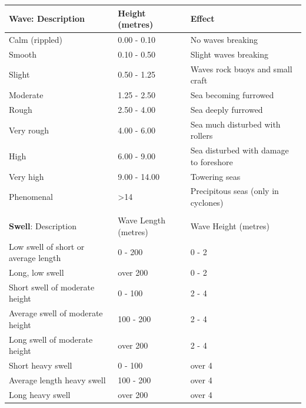 \documentclass[class=article,crop=true]{standalone}
\begin{document}
 
\begin{tabular}{L{6cm}L{6cm}L{6.5cm}}
\toprule\toprule
   \textbf{Wave}: Description     & Height (metres)  &Effect          \\
  \hline
   Calm (rippled)                & 0.00   - 0.10          & No waves breaking                                                \\
   Smooth                               & 0.10 - 0.50        & Slight waves breaking                                            \\
   Slight                               & 0.50 - 1.25       & Waves rock buoys and small craft                                          \\
   Moderate                             & 1.25 - 2.50       & Sea becoming furrowed                                                     \\
   Rough                                & 2.50 - 4.00          & Sea deeply furrowed                                                       \\
   Very rough                           & 4.00 - 6.00          & Sea much disturbed with rollers                      \\
   High                                 & 6.00 - 9.00         & Sea disturbed with damage to foreshore \\
   Very high                            & 9.00 - 14.00         & Towering seas                                                             \\
   Phenomenal                           & \textgreater{}14 & Precipitous seas (only in cyclones)                           \\
   &                  &   
                                         \\
                                            \hline  \hline                                 
    \textbf{Swell}: Description                   & Wave Length   (metres)     & Wave Height  (metres)                                                               \\
     \hline
   Low swell of short or average length & 0 - 200        & 0 - 2                       \\
   Long, low swell                      & over 200       & 0 - 2                                                                    \\
   Short swell of moderate height       & 0 - 100          & 2 - 4                    \\
   Average swell of moderate height     & 100 - 200        & 2 - 4                        \\
   Long swell of moderate height        & over 200       & 2 - 4           \\
   Short heavy swell                    & 0 - 100          & over 4                                                                  \\
   Average length heavy swell           & 100 - 200        & over 4              \\
   Long heavy swell                     & over 200       & over 4     \\
\bottomrule\bottomrule
\end{tabular}%
\end{document}
